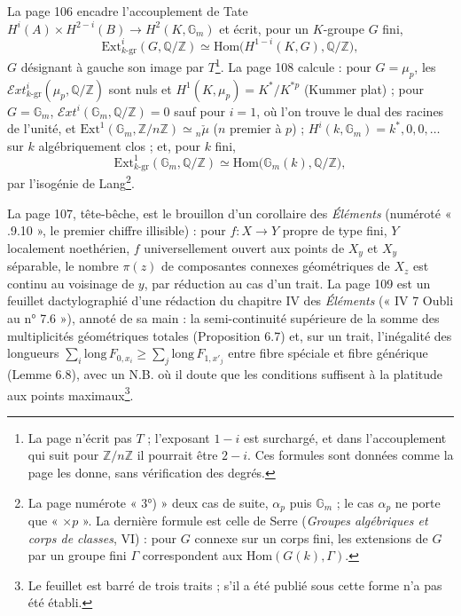\documentclass[11pt,a4paper]{article}
\begin{document}
La page 106 encadre l'accouplement de Tate $H^i(A) \times H^{2-i}(B) \to H^2(K,
\mathbb{G}_m)$ et écrit, pour un $K$-groupe $G$ fini,
\[
\mathrm{Ext}^i_{k\text{-gr}}(G, \mathbb{Q}/\mathbb{Z}) \simeq
\mathrm{Hom}\bigl(H^{1-i}(K, G), \mathbb{Q}/\mathbb{Z}\bigr),
\]
$G$ désignant à gauche son image par $T$\footnote{La page n'écrit pas $T$ ;
l'exposant $1 - i$ est surchargé, et dans l'accouplement qui suit pour
$\mathbb{Z}/n\mathbb{Z}$ il pourrait être $2 - i$. Ces formules sont données
comme la page les donne, sans vérification des degrés.}. La page 108 calcule :
pour $G = \mu_p$, les $\mathcal{E}xt^i_{k\text{-gr}}(\mu_p,
\mathbb{Q}/\mathbb{Z})$ sont nuls et $H^1(K, \mu_p) = K^{*}/K^{*p}$ (Kummer
plat) ; pour $G = \mathbb{G}_m$, $\mathcal{E}xt^i(\mathbb{G}_m,
\mathbb{Q}/\mathbb{Z}) = 0$ sauf pour $i = 1$, où l'on trouve le dual des racines
de l'unité, et $\mathrm{Ext}^1(\mathbb{G}_m, \mathbb{Z}/n\mathbb{Z}) \simeq
{}_n\check\mu$ ($n$ premier à $p$) ; $H^i(k, \mathbb{G}_m) = k^{*}, 0, 0, \ldots$ sur
$k$ algébriquement clos ; et, pour $k$ fini,
\[
\mathrm{Ext}^1_{k\text{-gr}}(\mathbb{G}_m, \mathbb{Q}/\mathbb{Z}) \simeq
\mathrm{Hom}\bigl(\mathbb{G}_m(k), \mathbb{Q}/\mathbb{Z}\bigr),
\]
par l'isogénie de Lang\footnote{La page numérote « 3°) » deux cas de suite,
$\alpha_p$ puis $\mathbb{G}_m$ ; le cas $\alpha_p$ ne porte que « $\times p$ ». La
dernière formule est celle de Serre (\emph{Groupes algébriques et corps de
classes}, VI) : pour $G$ connexe sur un corps fini, les extensions de $G$ par un
groupe fini $\Gamma$ correspondent aux $\mathrm{Hom}(G(k), \Gamma)$.}.

La page 107, tête-bêche, est le brouillon d'un corollaire des \emph{Éléments}
(numéroté « .9.10 », le premier chiffre illisible) : pour $f : X \to Y$ propre de
type fini, $Y$ localement noethérien, $f$ universellement ouvert aux points de
$X_y$ et $X_y$ séparable, le nombre $\pi(z)$ de composantes connexes géométriques
de $X_z$ est continu au voisinage de $y$, par réduction au cas d'un trait. La
page 109 est un feuillet dactylographié d'une rédaction du chapitre IV des
\emph{Éléments} (« IV 7 Oubli au n° 7.6 »), annoté de sa main : la semi-continuité
supérieure de la somme des multiplicités géométriques totales (Proposition 6.7)
et, sur un trait, l'inégalité des longueurs $\sum_i \mathrm{long}\,F_{0,x_i}
\geq \sum_j \mathrm{long}\,F_{1,x'_j}$ entre fibre spéciale et fibre générique
(Lemme 6.8), avec un N.B. où il doute que les conditions suffisent à la platitude
aux points maximaux\footnote{Le feuillet est barré de trois traits ; s'il a été
publié sous cette forme n'a pas été établi.}.
\end{document}
